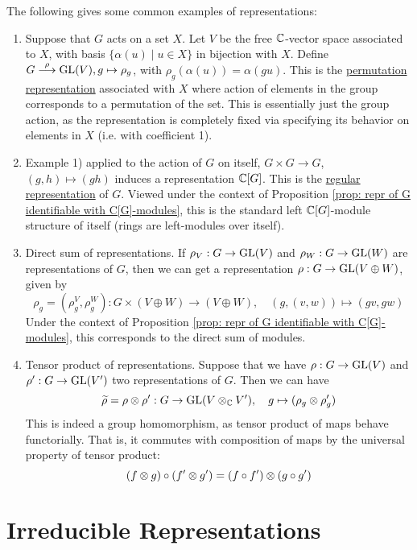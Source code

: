 \textstart
The following gives some common examples of representations:
\begin{enumerate}[label=\arabic*)]
    \item Suppose that $G$ acts on a set $X$. Let $V$ be the free $\mathbb{C}$-vector space associated to $X$, with basis $\{ \alpha(u) \mid u \in X \}$ in bijection with $X$. Define $G \overset{\rho}{\longrightarrow} \mathrm{GL}(V), g \mapsto \rho_g$, with $\rho_g(\alpha(u)) = \alpha(gu)$. This is the \underline{permutation representation} associated with $X$ where action of elements in the group corresponds to a permutation of the set. This is essentially just the group action, as the representation is completely fixed via specifying its behavior on elements in $X$ (i.e. with coefficient 1). 
    \item Example 1) applied to the action of $G$ on itself, $G \times G \to G$, $(g, h) \mapsto (gh)$ induces a representation $\mathbb{C}[G]$. This is the \underline{regular representation} of $G$. Viewed under the context of Proposition \ref{prop: repr of G identifiable with C[G]-modules}, this is the standard left $\mathbb{C}[G]$-module structure of itself (rings are left-modules over itself). 
    \item Direct sum of representations. If $\rho_V: G \to \mathrm{GL}(V)$ and $\rho_W: G \to \mathrm{GL}(W)$ are representations of $G$, then we can get a representation $\rho: G \to \mathrm{GL}(V \oplus W)$, given by 
    \[
        \rho_g = (\rho_g^V, \rho_g^W): G \times (V \oplus W) \to (V \oplus W), \quad (g, (v, w)) \mapsto (gv, gw)
    \]
    Under the context of Proposition \ref{prop: repr of G identifiable with C[G]-modules}, this corresponds to the direct sum of modules. 
    \item Tensor product of representations. Suppose that we have $\rho: G \to \mathrm{GL}(V)$ and $\rho': G \to \mathrm{GL}(V')$ two representations of $G$. Then we can have
    \[
        \widetilde{\rho} = \rho \otimes \rho': G \to \mathrm{GL}(V \otimes_{\mathbb{C}} V'), \quad g \mapsto (\rho_g \otimes \rho_g')
    \]
    This is indeed a group homomorphism, as tensor product of maps behave functorially. That is, it commutes with composition of maps by the universal property of tensor product:
    \[
        (f \otimes g) \circ (f' \otimes g') = (f \circ f') \otimes (g \circ g')
    \]
\end{enumerate}

\section{Irreducible Representations}


